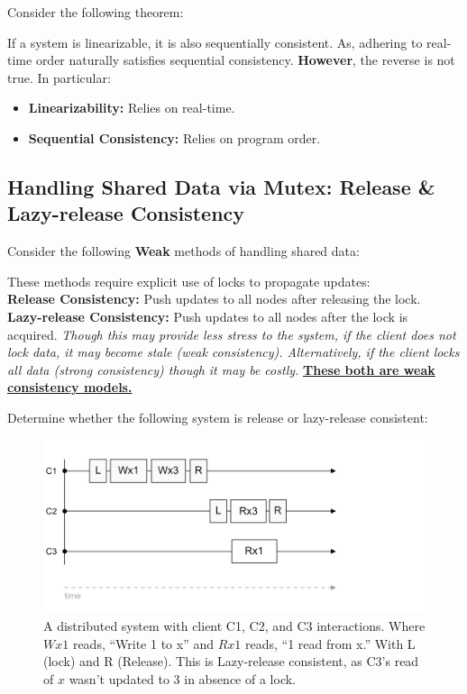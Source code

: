 \noindent
Consider the following theorem:
\begin{theo}
    
    If a system is linearizable, it is also sequentially consistent. As,  adhering to real-time order naturally satisfies sequential consistency.
    \textbf{However}, the reverse is not true. In particular:
    \begin{itemize}
        \item \textbf{Linearizability:} Relies on real-time.
        \item \textbf{Sequential Consistency:} Relies on program order.
    \end{itemize}
\end{theo}

\subsection{Handling Shared Data via Mutex: Release \& Lazy-release Consistency}

\noindent
Consider the following \textbf{Weak} methods of handling shared data:
\begin{Def}
    
    These methods require explicit use of locks to propagate updates:\\
    \textbf{Release Consistency:} Push updates to all nodes after releasing the lock.\\
    \textbf{Lazy-release Consistency:} Push updates to all nodes after the lock is acquired.
    \textit{Though this may provide less stress to the system, if the client does not lock data, it may become stale (weak consistency).
    Alternatively, if the client locks all data (strong consistency) though it may be costly. }\underline{\textbf{These both are weak consistency models.}}
\end{Def}

\noindent
Determine whether the following system is release or lazy-release consistent:

\begin{figure}[h]
    \centering
    \includegraphics[width=.9\textwidth]{Sections/consist/rel.png}
    \caption{A distributed system with client C1, C2, and C3 interactions. Where $Wx1$ reads, ``Write 1 to x'' and $Rx1$ reads, ``1 read from x.'' With L (lock) and R (Release). This 
    is Lazy-release consistent, as C3's read of $x$ wasn't updated to 3 in absence of a lock.}
\end{figure}
\newpage 

